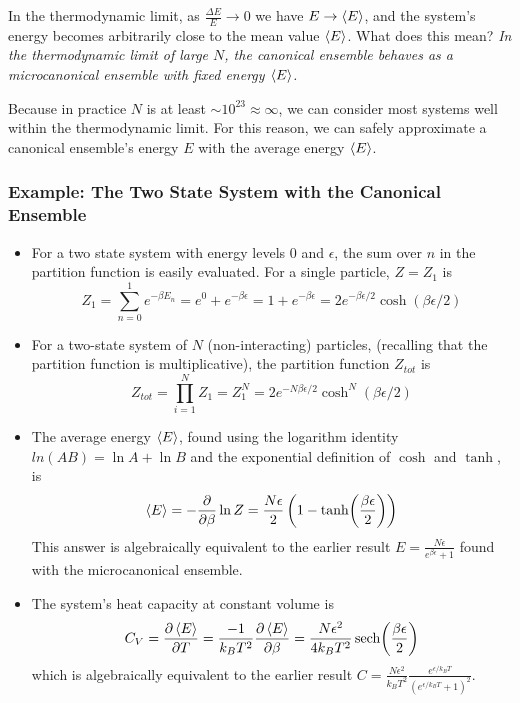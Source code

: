 \documentclass[11pt, a4paper]{article}
\begin{document}
\begin{itemize}
	In the thermodynamic limit, as $ \frac{\Delta E}{E} \to 0 $ we have $ E \to \expval{E} $, and the system's energy becomes arbitrarily close to the mean value $ \expval{E} $. What does this mean? \textit{In the thermodynamic limit of large $ N $, the canonical ensemble behaves as a microcanonical ensemble with fixed energy $ \expval{E} $. }
	
	Because in practice $ N $ is at least $ \sim 10^{23} \approx \infty$, we can consider most systems well within the thermodynamic limit. For this reason, we can safely approximate a canonical ensemble's energy $ E $ with the average energy $ \expval{E} $.

\end{itemize}

\subsubsection{Example: The Two State System with the Canonical Ensemble}		
\begin{itemize}
	\item For a two state system with energy levels $ 0 $ and $ \epsilon $, the sum over $ n $ in the partition function is easily evaluated. For a single particle, $ Z = Z_{1} $ is
	\begin{equation*}
		Z_{1} = \sum_{n=0}^{1} e^{-\beta E_{n}} = e^{0} + e^{-\beta \epsilon} = 1 + e^{-\beta \epsilon} = 2e^{-\beta \epsilon/2} \cosh(\beta \epsilon /2 )
	\end{equation*}
	
	\item For a two-state system of $ N $ (non-interacting) particles, (recalling that the partition function is multiplicative), the partition function $ Z_{tot} $ is
	\begin{equation*}
		Z_{tot} = \prod_{i=1}^{N}Z_{1} = Z_{1}^{N} = 2e^{-N\beta \epsilon/2} \cosh^{N}(\beta\epsilon/2)
	\end{equation*}
	
	\item The average energy $ \expval{E} $, found using the logarithm identity $ ln (AB) = \ln A + \ln B $ and the exponential definition of $ \cosh $ and $ \tanh $, is
	\begin{equation*}
		\expval{E} = - \pdv{}{\beta} \ln Z = \frac{N\epsilon}{2} \left (1 - \tanh(\frac{\beta \epsilon}{2})\right )
	\end{equation*}
	This answer is algebraically equivalent to the earlier result $ E = \frac{N\epsilon}{e^{\beta \epsilon} + 1} $ found with the microcanonical ensemble.
	
	\item The system's heat capacity at constant volume is
	\begin{equation*}
		C_{V} = \pdv{\expval{E}}{T} = \frac{-1}{k_{B}T^{2}}\pdv{\expval{E}}{\beta} = \frac{N\epsilon^{2}}{4k_{B}T^{2}} \sech(\frac{\beta \epsilon}{2})
	\end{equation*}
	which is algebraically equivalent to the earlier result	$ C = \frac{N \epsilon^{2}}{k_{B}T^{2}} \frac{e^{\epsilon/k_{B}T}}{(e^{\epsilon/k_{B}T} + 1)^{2}}  $.
	
\end{itemize}
\end{document}
